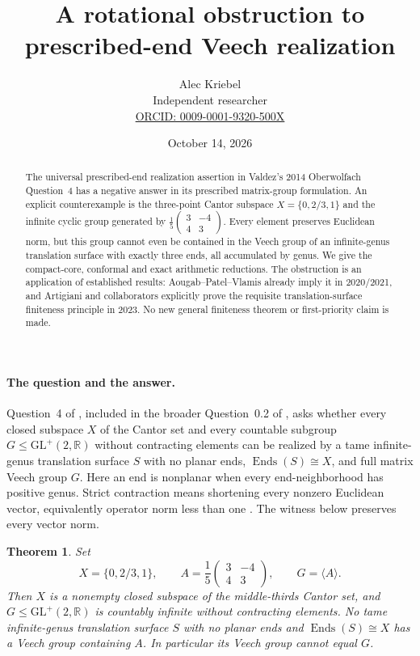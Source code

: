 \documentclass[11pt]{article}
\title{A rotational obstruction to prescribed-end Veech realization}
\author{Alec Kriebel\\\small Independent researcher\\\small\href{https://orcid.org/0009-0001-9320-500X}{ORCID: 0009-0001-9320-500X}}
\date{October 14, 2026}
\newtheorem{theorem}{Theorem}
\newcommand{\GL}{\mathrm{GL}^{+}(2,\mathbb R)}
\begin{document}
\maketitle
\begin{abstract}
The universal prescribed-end realization assertion in Valdez's 2014 Oberwolfach Question~4 has a negative answer in its prescribed matrix-group formulation. An explicit counterexample is the three-point Cantor subspace $X=\{0,2/3,1\}$ and the infinite cyclic group generated by $\frac15\left(\begin{smallmatrix}3&-4\\4&3\end{smallmatrix}\right)$. Every element preserves Euclidean norm, but this group cannot even be contained in the Veech group of an infinite-genus translation surface with exactly three ends, all accumulated by genus. We give the compact-core, conformal and exact arithmetic reductions. The obstruction is an application of established results: Aougab--Patel--Vlamis already imply it in 2020/2021, and Artigiani and collaborators explicitly prove the requisite translation-surface finiteness principle in 2023. No new general finiteness theorem or first-priority claim is made.
\end{abstract}

\paragraph{The question and the answer.}
Question~4 of \cite[p.~887]{OWR}, included in the broader Question~0.2 of \cite{RMV}, asks whether every closed subspace $X$ of the Cantor set and every countable subgroup $G\leq\GL$ without contracting elements can be realized by a tame infinite-genus translation surface $S$ with no planar ends, $\operatorname{Ends}(S)\cong X$, and full matrix Veech group $G$. Here an end is nonplanar when every end-neighborhood has positive genus. Strict contraction means shortening every nonzero Euclidean vector, equivalently operator norm less than one \cite[p.~674]{PSV}. The witness below preserves every vector norm.

\begin{theorem}\label{main}
Set
\[
 X=\{0,2/3,1\},\qquad A=\frac15\begin{pmatrix}3&-4\\4&3\end{pmatrix},\qquad G=\langle A\rangle.
\]
Then $X$ is a nonempty closed subspace of the middle-thirds Cantor set, and $G\leq\GL$ is countably infinite without contracting elements. No tame infinite-genus translation surface $S$ with no planar ends and $\operatorname{Ends}(S)\cong X$ has a Veech group containing $A$. In particular its Veech group cannot equal $G$.
\end{theorem}
\end{document}
